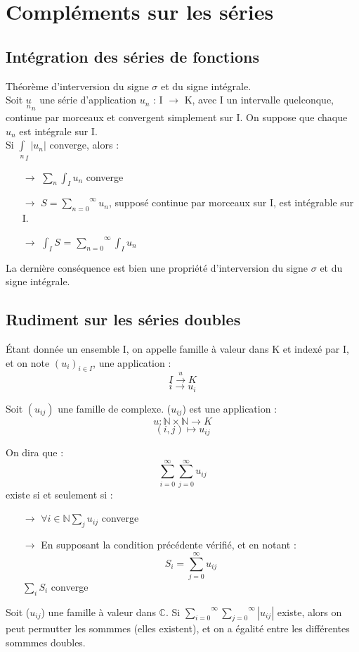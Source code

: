\chapter{Compléments sur les séries}
\section{Intégration des séries de fonctions}
\begin{theo}
Théorème d'interversion du signe $\sigma$ et du signe intégrale.\\
Soit $\underset{n} u_n$ une série d'application $u_n$ : I $\rightarrow$ K, avec I un intervalle quelconque, continue par morceaux et convergent simplement sur I. On suppose que chaque $u_n$ est intégrale sur I.\\
Si $\underset{n} \int_I |u_n|$ converge, alors :
\begin{itemize}
 \item[$\rightarrow$] $\underset{n} \sum \int_I u_n$ converge
 \item[$\rightarrow$] $S = \underset{n = 0 }\sum^{\infty} u_n$, supposé continue par morceaux sur I, est intégrable sur I.
 \item[$\rightarrow$] $\int_I S$ = $\underset{n=0}\sum^{\infty} \int_I u_n$
\end{itemize}
La dernière conséquence est bien une propriété d'interversion du signe $\sigma$ et du signe intégrale.
\end{theo}
\section{Rudiment sur les séries doubles}
\begin{de}
Étant donnée un ensemble I, on appelle famille à valeur dans K et indexé par I, et on note $(u_i)_{i \in I}$, une application :
$$I \overset{u}\rightarrow K$$
$$i \rightarrow u_i$$
\end{de}
Soit $(u_{ij})$ une famille de complexe. ($u_{ij}$) est une application :
$$u: \mathbb{N}\times\mathbb{N} \rightarrow K$$
$$(i,j) \mapsto u_{ij}$$
\begin{de}
On dira que :
$$\sum_{i = 0}^{\infty} \sum_{j=0}^{\infty} u_{ij}$$
existe si et seulement si : 
\begin{itemize}
 \item[$\rightarrow$] $\forall i \in \mathbb{N} \underset{j}\sum u_{ij}$ converge
 \item[$\rightarrow$] En supposant la condition précédente vérifié, et en notant :
$$S_i = \sum_{j=0}^{\infty} u_{ij}$$ 
$\underset{i}\sum S_i$ converge
\end{itemize}
\end{de}
\begin{theo}
Soit ($u_{ij}$) une famille à valeur dans $\mathbb{C}$. Si $\underset{i=0}\sum^{\infty} \underset{j=0}\sum^{\infty} |u_{ij}|$ existe, alors on peut permutter les sommmes (elles existent), et on a égalité entre les différentes sommmes doubles.
\end{theo}
